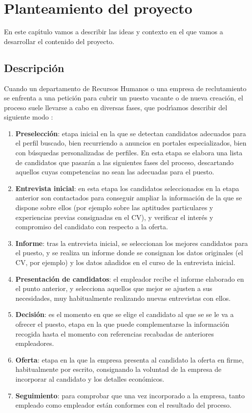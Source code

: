 
\chapter{Planteamiento del proyecto}

En este cap\'\i tulo vamos a describir las ideas y contexto en el que vamos a desarrollar el contenido del proyecto.

\section{Descripci\'on}
Cuando un departamento de Recursos Humanos o una empresa de reclutamiento se enfrenta a una petici\'on para
cubrir un puesto vacante o de nueva creaci\'on, el proceso suele llevarse a cabo en diversas fases, que 
podr\'\i amos describir del siguiente modo \cite{proceso_seleccion1}:
\begin{enumerate}
\item {\bf Preselección}: etapa inicial en la que se detectan candidatos adecuados para el perfil buscado, bien recurriendo a 
anuncios en portales especializados, bien con b\'usquedas personalizadas de perfiles. En esta etapa se elabora una lista 
de candidatos que pasar\'an a las siguientes fases del proceso, descartando aquellos cuyas competencias no sean las adecuadas
para el puesto. 
\item {\bf Entrevista inicial}: en esta etapa los candidatos seleccionados en la etapa anterior son contactados para  
conseguir ampliar la informaci\'on de la que se dispone sobre ellos  (por ejemplo sobre las aptitudes
particulares y experiencias previas consignadas en el CV), y verificar el inter\'es y compromiso del candidato
con respecto a la oferta.
\item {\bf Informe}: tras la entrevista inicial, se seleccionan los mejores candidatos para el puesto, y se realiza un informe
donde se consignan los datos originales (el CV, por ejemplo) y los datos a\~nadidos en el curso de la entrevista inicial.
\item {\bf Presentaci\'on de candidatos}: el empleador recibe el informe elaborado en el punto anterior, y selecciona aquellos
que mejor se ajusten a sus necesidades, muy habitualmente realizando nuevas entrevistas con ellos.
\item {\bf Decisi\'on}: es el momento en que se elige el candidato al que se se le va a ofrecer el puesto, etapa en la 
que puede complementarse la informaci\'on recogida hasta el momento con referencias recabadas de anteriores empleadores.
\item {\bf Oferta}: etapa en la que la empresa presenta al candidato la oferta en firme, habitualmente por escrito, consignando 
la voluntad de la empresa de incorporar al candidato y los detalles econ\'omicos. 
\item {\bf Seguimiento}:  para comprobar que una vez incorporado a la empresa, tanto empleado como empleador est\'an conformes con
el resultado del proceso.
\end{enumerate}

